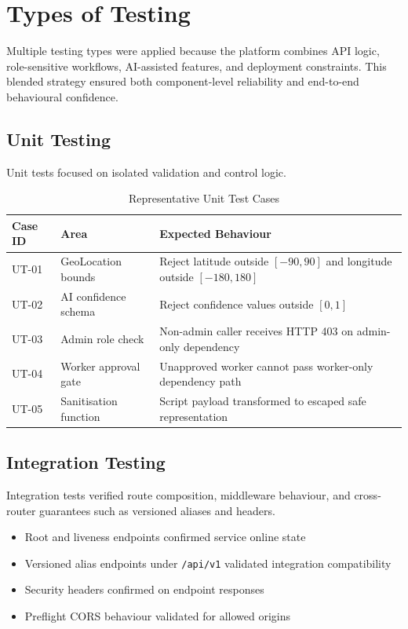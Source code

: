 \section{Types of Testing}

Multiple testing types were applied because the platform combines API logic, role-sensitive workflows, AI-assisted features, and deployment constraints. This blended strategy ensured both component-level reliability and end-to-end behavioural confidence.

\Needspace{0.9\textheight}
\subsection{Unit Testing}

Unit tests focused on isolated validation and control logic.

\begin{table}[H]
\centering
\begin{tabularx}{\textwidth}{|>{\RaggedRight\arraybackslash}X|>{\RaggedRight\arraybackslash}X|>{\RaggedRight\arraybackslash}X|}
\hline
\textbf{Case ID} & \textbf{Area} & \textbf{Expected Behaviour} \\ \hline
UT-01 & GeoLocation bounds & Reject latitude outside $[-90, 90]$ and longitude outside $[-180, 180]$ \\ \hline
UT-02 & AI confidence schema & Reject confidence values outside $[0, 1]$ \\ \hline
UT-03 & Admin role check & Non-admin caller receives HTTP 403 on admin-only dependency \\ \hline
UT-04 & Worker approval gate & Unapproved worker cannot pass worker-only dependency path \\ \hline
UT-05 & Sanitisation function & Script payload transformed to escaped safe representation \\ \hline
\end{tabularx}
\caption{Representative Unit Test Cases}
\end{table}

\subsection{Integration Testing}

Integration tests verified route composition, middleware behaviour, and cross-router guarantees such as versioned aliases and headers.

\begin{itemize}
\item Root and liveness endpoints confirmed service online state
\item Versioned alias endpoints under \texttt{/api/v1} validated integration compatibility
\item Security headers confirmed on endpoint responses
\item Preflight CORS behaviour validated for allowed origins
\end{itemize}


